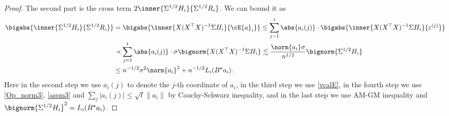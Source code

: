 \documentclass[aos,preprint]{imsart}
\begin{document}
\begin{proof}
\medskip
	 The second part is the cross term
	$2\inner{\Sigma^{1/2}H_i}{\Sigma^{1/2}R_i}$.
	We can bound it as %
	\begin{align*}
		 \bigabs{\inner{\Sigma^{1/2}H_i}{\Sigma^{1/2}R_i}} &= \bigabs{\inner{X (X^{\top}X)^{-1} \Sigma H_i  }{\cE{a}_i}}  \le \sum_{j=1}^t \abs{ {a}_i(j)} \cdot \bigabs{\inner{X (X^{\top} X)^{-1} \Sigma H_i}{\varepsilon^{(j)}}} \\
		&\prec \sum_{j=1}^t \abs{ {a}_i(j)} \cdot  \sigma \bignorm{X (X^{\top}X)^{-1} \Sigma H_i}  \lesssim   \frac{\norm{ {a}_i}   \sigma}{ n^{1/2} }\bignorm{ \Sigma^{1/2}H_i} \\
		&\le  n^{-1/2}\sigma^2  \norm{ {a}_i}^2 + n^{-1/2}L_i(B^\star a_i).
	\end{align*}
	Here in the second step we use $ {a}_i(j)$ to denote the $j$-th coordinate of $ {a}_i$, in the third step we use  \eqref{vcalE}, in the fourth step we use \eqref{Op_norm3}, \eqref{assm3} and $\sum_j |a_i(j)|\le \sqrt{t}\|a_i\|$ by Cauchy-Schwarz inequality, and in the last step we use AM-GM inequality and $\bignorm{\Sigma^{1/2}H_i}^2= L_i(B^\star a_i)$.

\end{proof}
\end{document}
